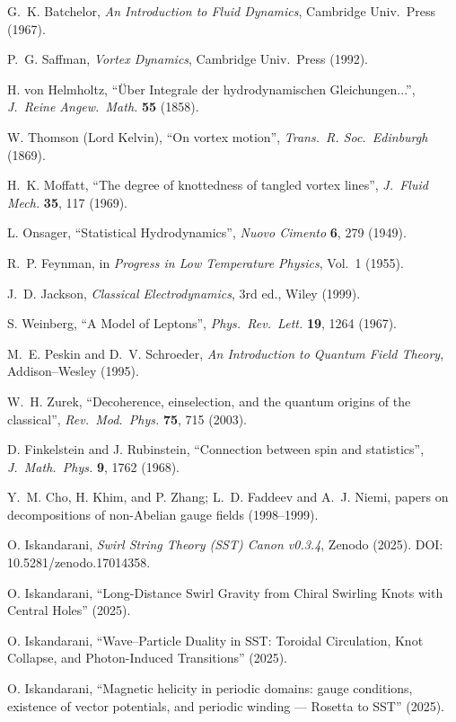 \documentclass[11pt]{article}
\begin{document}
	\begin{thebibliography}{99}

		G.~K. Batchelor, \emph{An Introduction to Fluid Dynamics}, Cambridge Univ.\ Press (1967).

		P.~G. Saffman, \emph{Vortex Dynamics}, Cambridge Univ.\ Press (1992).

		H. von Helmholtz, ``\"Uber Integrale der hydrodynamischen Gleichungen...'', \emph{J.\ Reine Angew.\ Math.} \textbf{55} (1858).

		W. Thomson (Lord Kelvin), ``On vortex motion'', \emph{Trans.\ R. Soc.\ Edinburgh} (1869).

		H.~K. Moffatt, ``The degree of knottedness of tangled vortex lines'', \emph{J.\ Fluid Mech.} \textbf{35}, 117 (1969).

		L. Onsager, ``Statistical Hydrodynamics'', \emph{Nuovo Cimento} \textbf{6}, 279 (1949).

		R.~P. Feynman, in \emph{Progress in Low Temperature Physics}, Vol.~1 (1955).

		J.~D. Jackson, \emph{Classical Electrodynamics}, 3rd ed., Wiley (1999).

		S. Weinberg, ``A Model of Leptons'', \emph{Phys.\ Rev.\ Lett.} \textbf{19}, 1264 (1967).

		M.~E. Peskin and D.~V. Schroeder, \emph{An Introduction to Quantum Field Theory}, Addison--Wesley (1995).

		W.~H. Zurek, ``Decoherence, einselection, and the quantum origins of the classical'', \emph{Rev.\ Mod.\ Phys.} \textbf{75}, 715 (2003).

		D. Finkelstein and J. Rubinstein, ``Connection between spin and statistics'', \emph{J.\ Math.\ Phys.} \textbf{9}, 1762 (1968).

		Y.~M. Cho, H. Khim, and P. Zhang; L.~D. Faddeev and A.~J. Niemi, papers on decompositions of non-Abelian gauge fields (1998--1999).

		O. Iskandarani, \emph{Swirl String Theory (SST) Canon v0.3.4}, Zenodo (2025). DOI: 10.5281/zenodo.17014358.

		O. Iskandarani, ``Long-Distance Swirl Gravity from Chiral Swirling Knots with Central Holes'' (2025).

		O. Iskandarani, ``Wave--Particle Duality in SST: Toroidal Circulation, Knot Collapse, and Photon-Induced Transitions'' (2025).

		O. Iskandarani, ``Magnetic helicity in periodic domains: gauge conditions, existence of vector potentials, and periodic winding --- Rosetta to SST'' (2025).

	\end{thebibliography}
\end{document}
